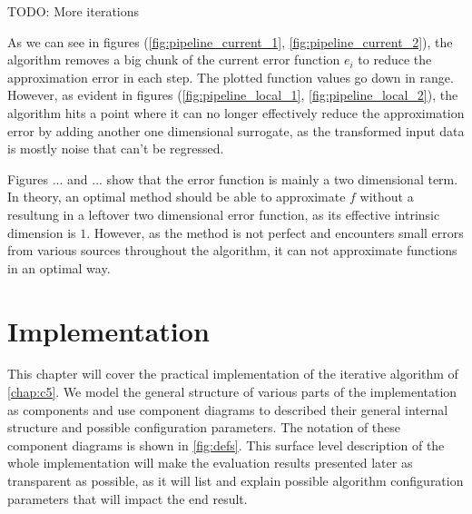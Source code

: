\documentclass[
  a4paper,  %
  twoside,  %
  bibliography=totoc,
  headsepline,
  cleardoublepage=empty,
  parskip=half,
  draft=false
]{scrbook}
\begin{document}
TODO: More iterations

As we can see in figures (\cref{fig:pipeline_current_1}, \cref{fig:pipeline_current_2}), the algorithm removes a big chunk of the current error function $e_i$ to reduce the approximation error in each step.
The plotted function values go down in range.
However, as evident in figures (\cref{fig:pipeline_local_1}, \cref{fig:pipeline_local_2}), the algorithm hits a point where it can no longer effectively reduce the approximation error by adding another one dimensional surrogate, as the transformed input data is mostly noise that can't be regressed.

Figures ... and ... show that the error function is mainly a two dimensional term.
In theory, an optimal method should be able to approximate $f$ without a resultung in a leftover two dimensional error function, as its effective intrinsic dimension is $1$.
However, as the method is not perfect and encounters small errors from various sources throughout the algorithm, it can not approximate functions in an optimal way.

\chapter{Implementation}
\label{chap:c6}

This chapter will cover the practical implementation of the iterative algorithm of \cref{chap:c5}.
We model the general structure of various parts of the implementation as components and use component diagrams to described their general internal structure and possible configuration parameters.
The notation of these component diagrams is shown in \cref{fig:defs}.
This surface level description of the whole implementation will make the evaluation results presented later as transparent as possible, as it will list and explain possible algorithm configuration parameters that will impact the end result.
\end{document}
